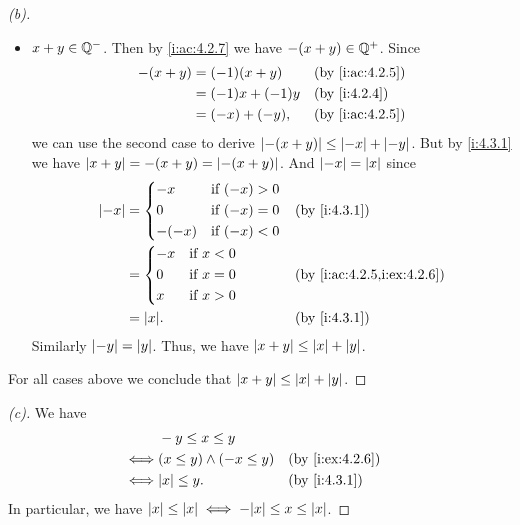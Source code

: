 \begin{proof}[(b)]
\begin{itemize}
\begin{itemize}
          \end{itemize}
    \item \(x + y \in \mathbb{Q}^-\).
          Then by \cref{i:ac:4.2.7} we have \(-(x + y) \in \mathbb{Q}^+\).
          Since
          \begin{align*}
            -(x + y) & = (-1) (x + y)    &  & \by{i:ac:4.2.5} \\
                     & = (-1) x + (-1) y &  & \by{i:4.2.4}    \\
                     & = (-x) + (-y),    &  & \by{i:ac:4.2.5}
          \end{align*}
          we can use the second case to derive \(\left\lvert-(x + y)\right\rvert \leq \left\lvert-x\right\rvert + \left\lvert-y\right\rvert\).
          But by \cref{i:4.3.1} we have \(\left\lvert x + y\right\rvert = -(x + y) = \left\lvert-(x + y)\right\rvert\).
          And \(\left\lvert-x\right\rvert = \left\lvert x\right\rvert\) since
          \begin{align*}
            \abs{-x} & = \begin{dcases}
                           -x    & \text{if } (-x) > 0 \\
                           0     & \text{if } (-x) = 0 \\
                           -(-x) & \text{if } (-x) < 0
                         \end{dcases} &  & \by{i:4.3.1}                     \\
                     & = \begin{dcases}
                           -x & \text{if } x < 0 \\
                           0  & \text{if } x = 0 \\
                           x  & \text{if } x > 0
                         \end{dcases}       &  & \by{i:ac:4.2.5,i:ex:4.2.6} \\
                     & = \abs{x}.                     &  & \by{i:4.3.1}
          \end{align*}
          Similarly \(\left\lvert-y\right\rvert = \left\lvert y\right\rvert\).
          Thus, we have \(\left\lvert x + y\right\rvert \leq \left\lvert x\right\rvert + \left\lvert y\right\rvert\).
  \end{itemize}
  For all cases above we conclude that \(\left\lvert x + y\right\rvert \leq \left\lvert x\right\rvert + \left\lvert y\right\rvert\).
\end{proof}

\begin{proof}[(c)]
  We have
  \begin{align*}
         & -y \leq x \leq y                                  \\
    \iff & (x \leq y) \land (-x \leq y) &  & \by{i:ex:4.2.6} \\
    \iff & \abs{x} \leq y.              &  & \by{i:4.3.1}
  \end{align*}
  In particular, we have \(\abs{x} \leq \abs{x} \iff -\abs{x} \leq x \leq \abs{x}\).
\end{proof}

